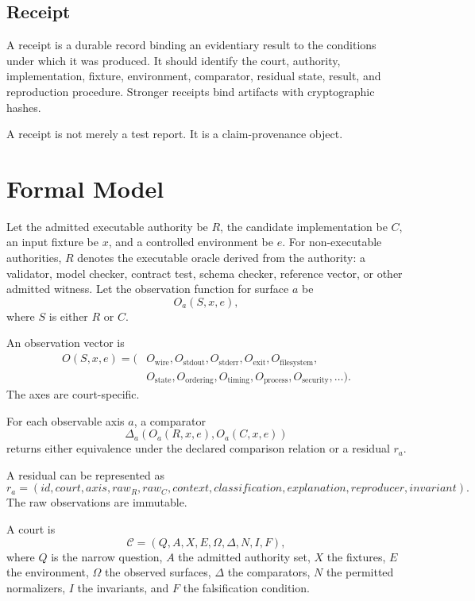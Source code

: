 \documentclass[11pt,a4paper]{article}
\begin{document}
\subsection{Receipt}
A receipt is a durable record binding an evidentiary result to the conditions under which it was produced. It should identify the court, authority, implementation, fixture, environment, comparator, residual state, result, and reproduction procedure. Stronger receipts bind artifacts with cryptographic hashes.

A receipt is not merely a test report. It is a claim-provenance object.

\section{Formal Model}
\label{sec:formal}

Let the admitted executable authority be \(R\), the candidate implementation be \(C\), an input fixture be \(x\), and a controlled environment be \(e\). For non-executable authorities, \(R\) denotes the executable oracle derived from the authority: a validator, model checker, contract test, schema checker, reference vector, or other admitted witness. Let the observation function for surface \(a\) be
\[
  O_a(S,x,e),
\]
where \(S\) is either \(R\) or \(C\).

An observation vector is
\[
\begin{aligned}
O(S,x,e) = (&
O_{\text{wire}},
O_{\text{stdout}},
O_{\text{stderr}},
O_{\text{exit}},
O_{\text{filesystem}},\\
&
O_{\text{state}},
O_{\text{ordering}},
O_{\text{timing}},
O_{\text{process}},
O_{\text{security}},
\ldots ).
\end{aligned}
\]
The axes are court-specific.

For each observable axis \(a\), a comparator
\[
  \Delta_a(O_a(R,x,e),O_a(C,x,e))
\]
returns either equivalence under the declared comparison relation or a residual \(r_a\).

A residual can be represented as
\[
r_a =
(
id,
court,
axis,
raw_R,
raw_C,
context,
classification,
explanation,
reproducer,
invariant
).
\]
The raw observations are immutable.

A court is
\[
\mathcal{C} =
(Q,A,X,E,\Omega,\Delta,N,I,F),
\]
where \(Q\) is the narrow question, \(A\) the admitted authority set, \(X\) the fixtures, \(E\) the environment, \(\Omega\) the observed surfaces, \(\Delta\) the comparators, \(N\) the permitted normalizers, \(I\) the invariants, and \(F\) the falsification condition.
\end{document}
